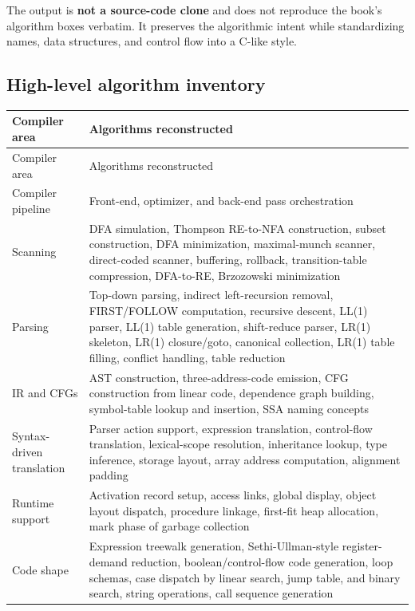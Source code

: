 \documentclass[10pt,letterpaper]{article}
\begin{document}
The output is \textbf{not a source-code clone} and does not reproduce the book's algorithm boxes verbatim. It preserves the algorithmic intent while standardizing names, data structures, and control flow into a C-like style.

\subsection*{High-level algorithm inventory}
{}

\begin{longtable}{L{0.27\textwidth}L{0.66\textwidth}}
\toprule
Compiler area & Algorithms reconstructed \\
\midrule\endfirsthead
\toprule
Compiler area & Algorithms reconstructed \\
\midrule\endhead
Compiler pipeline & Front-end, optimizer, and back-end pass orchestration \\
Scanning & DFA simulation, Thompson RE-to-NFA construction, subset construction, DFA minimization, maximal-munch scanner, direct-coded scanner, buffering, rollback, transition-table compression, DFA-to-RE, Brzozowski minimization \\
Parsing & Top-down parsing, indirect left-recursion removal, FIRST/FOLLOW computation, recursive descent, LL(1) parser, LL(1) table generation, shift-reduce parser, LR(1) skeleton, LR(1) closure/goto, canonical collection, LR(1) table filling, conflict handling, table reduction \\
IR and CFGs & AST construction, three-address-code emission, CFG construction from linear code, dependence graph building, symbol-table lookup and insertion, SSA naming concepts \\
Syntax-driven translation & Parser action support, expression translation, control-flow translation, lexical-scope resolution, inheritance lookup, type inference, storage layout, array address computation, alignment padding \\
Runtime support & Activation record setup, access links, global display, object layout dispatch, procedure linkage, first-fit heap allocation, mark phase of garbage collection \\
Code shape & Expression treewalk generation, Sethi-Ullman-style register-demand reduction, boolean/control-flow code generation, loop schemas, case dispatch by linear search, jump table, and binary search, string operations, call sequence generation \\

\end{longtable}
\end{document}
